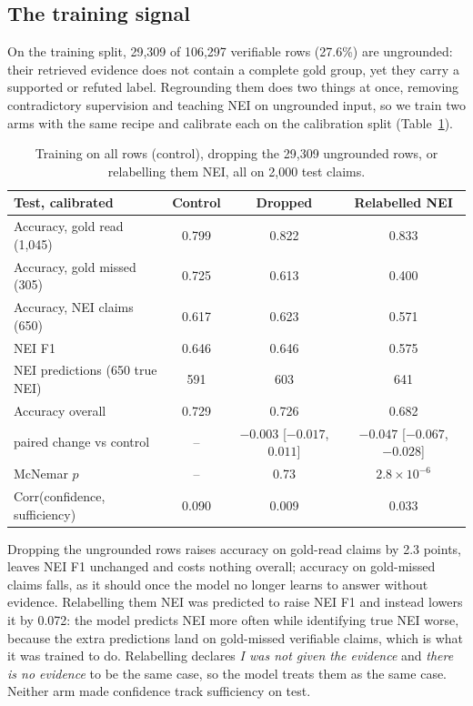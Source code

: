 \documentclass[11pt]{article}
\begin{document}
\subsection{The training signal}
\label{sec:training}

On the training split, 29,309 of 106,297 verifiable rows (27.6\%) are ungrounded: their retrieved evidence
does not contain a complete gold group, yet they carry a supported or refuted label. Regrounding them does
two things at once, removing contradictory supervision and teaching NEI on ungrounded input, so we train
two arms with the same recipe and calibrate each on the calibration split (Table~\ref{tab:training}).

\begin{table}[t]
\centering
\small
\begin{tabular}{lccc}
\toprule
Test, calibrated & Control & Dropped & Relabelled NEI \\
\midrule
Accuracy, gold read (1,045) & 0.799 & 0.822 & 0.833 \\
Accuracy, gold missed (305) & 0.725 & 0.613 & 0.400 \\
Accuracy, NEI claims (650) & 0.617 & 0.623 & 0.571 \\
NEI F1 & 0.646 & 0.646 & 0.575 \\
NEI predictions (650 true NEI) & 591 & 603 & 641 \\
Accuracy overall & 0.729 & 0.726 & 0.682 \\
\quad paired change vs control & -- & $-0.003$ [$-0.017$, $0.011$] & $-0.047$ [$-0.067$, $-0.028$] \\
\quad McNemar $p$ & -- & 0.73 & $2.8\times10^{-6}$ \\
Corr(confidence, sufficiency) & 0.090 & 0.009 & 0.033 \\
\bottomrule
\end{tabular}
\caption{Training on all rows (control), dropping the 29,309 ungrounded rows, or relabelling them NEI,
all on 2,000 test claims.}
\label{tab:training}
\end{table}

Dropping the ungrounded rows raises accuracy on gold-read claims by 2.3 points, leaves NEI F1 unchanged
and costs nothing overall; accuracy on gold-missed claims falls, as it should once the model no longer
learns to answer without evidence. Relabelling them NEI was predicted to raise NEI F1 and instead lowers it
by 0.072: the model predicts NEI more often while identifying true NEI worse, because the extra predictions
land on gold-missed verifiable claims, which is what it was trained to do. Relabelling declares \emph{I was
not given the evidence} and \emph{there is no evidence} to be the same case, so the model treats them as
the same case. Neither arm made confidence track sufficiency on test.
\end{document}
